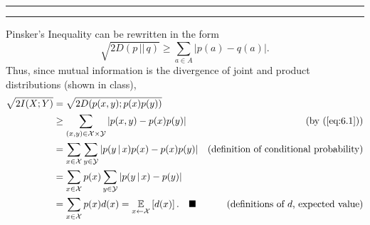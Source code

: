 \documentclass[11pt]{article}
\newcounter{questionCounter}
\newcounter{partCounter}[questionCounter]
\newenvironment{question}[2][\arabic{questionCounter}]{%
    \setcounter{partCounter}{0}%
    \vspace{.25in} \hrule \vspace{0.5em}%
        \noindent{\bf #2}%
    \vspace{0.8em} \hrule \vspace{.10in}%
    \addtocounter{questionCounter}{1}%
}{}
\newcommand{\mqed}{\quad \blacksquare}
\newcommand{\E}[2]{\operatornamewithlimits{\mathbb{E}}_{#2}\left[ #1 \right]} %
\begin{document}
\begin{question}{Problem 6}
Pinsker's Inequality can be rewritten in the form
\begin{equation}
\sqrt{2D(p \, || \, q)} \geq \sum_{a \in A} |p(a) - q(a)|.
\label{eq:6.1}
\end{equation}
Thus, since mutual information is the divergence of joint and product
distributions (shown in class),
\begin{align*}
\sqrt{2I(X;Y)}
 & = \sqrt{2D(p(x,y);p(x)p(y))} \\
 & \geq \sum_{(x,y) \in \mathcal{X} \times \mathcal{Y}}   |p(x,y) - p(x)p(y)|
 & \mbox{(by (\ref{eq:6.1}))} \\ 
 & = \sum_{x \in \mathcal{X}} \sum_{y \in \mathcal{Y}}
                                           |p(y \, | \, x)p(x) - p(x)p(y)|
 & \mbox{(definition of conditional probability)} \\
 & = \sum_{x \in \mathcal{X}} p(x) \sum_{y \in \mathcal{Y}}
                                           |p(y \, | \, x) - p(y)| \\
 & = \sum_{x \in \mathcal{X}} p(x) d(x) 
   = \E{d(x)}{x \leftarrow \mathcal{X}}. \mqed
 & \mbox{(definitions of $d$, expected value)}
\end{align*}
\end{question}
\end{document}
